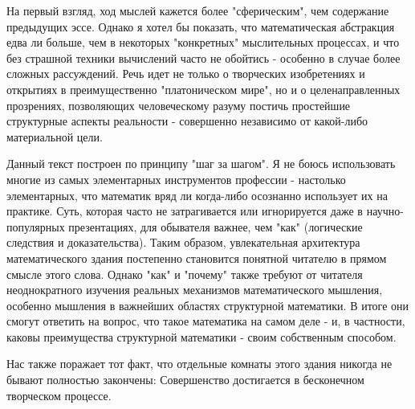 На первый взгляд, ход мыслей кажется более "сферическим", чем содержание предыдущих эссе. Однако я хотел бы показать, что математическая абстракция едва ли больше, чем в некоторых "конкретных" мыслительных процессах, и что без страшной техники вычислений часто не обойтись - особенно в случае более сложных рассуждений. Речь идет не только о творческих изобретениях и открытиях в преимущественно "платоническом мире", но и о целенаправленных прозрениях, позволяющих человеческому разуму постичь простейшие структурные аспекты реальности - совершенно независимо от какой-либо материальной цели.

Данный текст построен по принципу "шаг за шагом". Я не боюсь использовать многие из самых элементарных инструментов профессии - настолько элементарных, что математик вряд ли когда-либо осознанно использует их на практике. Суть, которая часто не затрагивается или игнорируется даже в научно-популярных презентациях, для обывателя важнее, чем "как" (логические следствия и доказательства). Таким образом, увлекательная архитектура математического здания постепенно становится понятной читателю в прямом смысле этого слова. Однако "как" и "почему" также требуют от читателя неоднократного изучения реальных механизмов математического мышления, особенно мышления в важнейших областях структурной математики. В итоге они смогут ответить на вопрос, что такое математика на самом деле - и, в частности, каковы преимущества структурной математики - своим собственным способом.

Нас также поражает тот факт, что отдельные комнаты этого здания никогда не бывают полностью закончены: Совершенство достигается в бесконечном творческом процессе.
